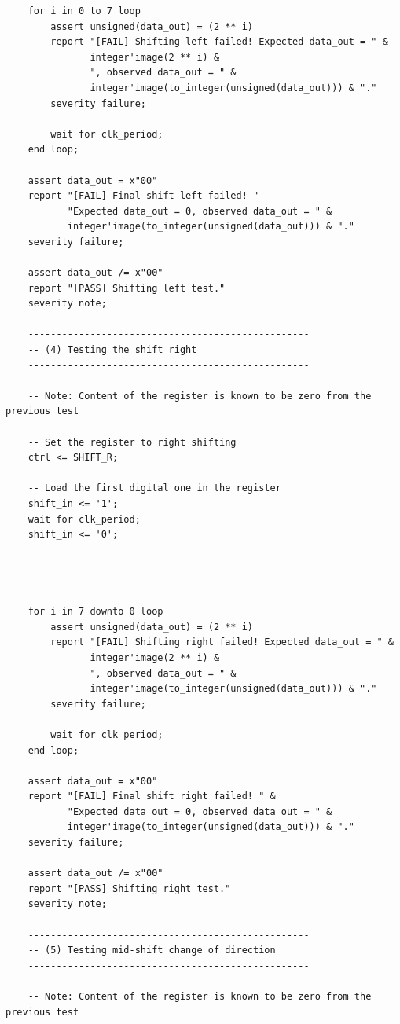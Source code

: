 \documentclass[10pt]{article}
\begin{document}
\begin{verbatim}
    for i in 0 to 7 loop
        assert unsigned(data_out) = (2 ** i)
        report "[FAIL] Shifting left failed! Expected data_out = " &
               integer'image(2 ** i) &
               ", observed data_out = " & 
               integer'image(to_integer(unsigned(data_out))) & "."
        severity failure;
        
        wait for clk_period;
    end loop;
    
    assert data_out = x"00"
    report "[FAIL] Final shift left failed! "
           "Expected data_out = 0, observed data_out = " & 
           integer'image(to_integer(unsigned(data_out))) & "."
    severity failure;
    
    assert data_out /= x"00"
    report "[PASS] Shifting left test."
    severity note;
    
    --------------------------------------------------
    -- (4) Testing the shift right
    --------------------------------------------------
    
    -- Note: Content of the register is known to be zero from the previous test
    
    -- Set the register to right shifting
    ctrl <= SHIFT_R; 
   
    -- Load the first digital one in the register
    shift_in <= '1'; 
    wait for clk_period;
    shift_in <= '0';
    
    
    
    
    for i in 7 downto 0 loop
        assert unsigned(data_out) = (2 ** i)
        report "[FAIL] Shifting right failed! Expected data_out = " &
               integer'image(2 ** i) &
               ", observed data_out = " & 
               integer'image(to_integer(unsigned(data_out))) & "."
        severity failure;
        
        wait for clk_period;
    end loop;
    
    assert data_out = x"00"
    report "[FAIL] Final shift right failed! " &
           "Expected data_out = 0, observed data_out = " & 
           integer'image(to_integer(unsigned(data_out))) & "."
    severity failure;
    
    assert data_out /= x"00"
    report "[PASS] Shifting right test."
    severity note;

    --------------------------------------------------
    -- (5) Testing mid-shift change of direction
    --------------------------------------------------
    
    -- Note: Content of the register is known to be zero from the previous test
    

\end{verbatim}
\end{document}
